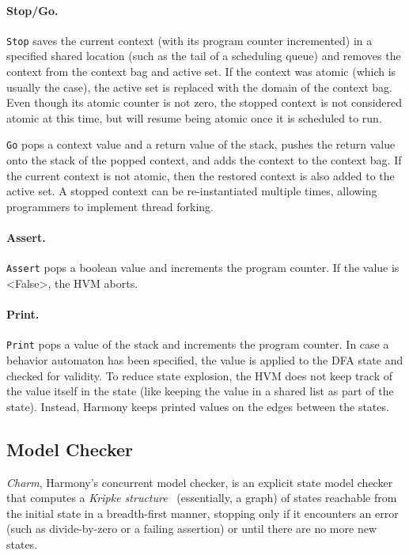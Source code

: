 \documentclass[twocolumn]{article}
\begin{document}
\paragraph{Stop/Go.} \texttt{Stop} saves the current context
(with its program counter incremented) in a specified shared location
(such as the tail of a scheduling queue) and removes the context
from the context bag and active set.  If the context was atomic
(which is usually the case), the active set is replaced with the
domain of the context bag.  Even though its atomic counter is not
zero, the stopped context is not considered atomic at this time,
but will resume being atomic once it is scheduled to run.

\texttt{Go} pops a context value and a return value of the stack,
pushes the return value onto the stack of the popped context, and adds
the context to the context bag.  If the current context is not atomic,
then the restored context is also added to the active set.
A stopped context can be re-instantiated multiple times, allowing
programmers to implement thread forking.

\paragraph{Assert.}  \texttt{Assert} pops a boolean value and increments
the program counter.  If the value is <{False}>, the HVM aborts.

\paragraph{Print.}  \texttt{Print} pops a value of the stack and increments
the program counter.  In case a behavior automaton has been specified, the
value is applied to the DFA state and checked for validity.
To reduce state explosion, the HVM does not keep track of the value itself
in the state (like keeping the value in a shared list as part of the state).
Instead, Harmony keeps printed values on the edges between the states.

\subsection{Model Checker}

\emph{Charm}, Harmony's concurrent model checker, is an explicit state model
checker that computes a \emph{Kripke structure}~\cite{Kripke1963}
(essentially, a graph) of states reachable
from the initial state in a breadth-first manner, stopping only if
it encounters an error (such as divide-by-zero or a failing assertion)
or until there are no more new states.
\end{document}
